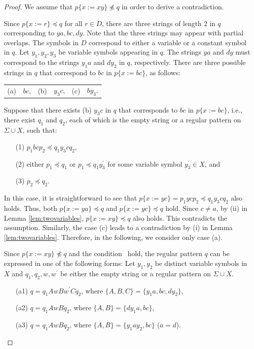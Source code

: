   \begin{proof}
  We assume that $p \{ x := xy \} \not \preceq q$ in order to derive a contradiction.

  Since $p \{ x := r \} \preceq q$ for all $r \in D$, there are three strings of length $2$ in $q$ corresponding to $ya, bc, dy$.
  Note that the three strings may appear with partial overlaps.
  The symbols in $D$ correspond to either a variable or a constant symbol in $q$.
  Let $y_{1}, y_{2}, y_{3}$ be variable symbols appearing in $q$.
  The strings $ya$ and $dy$ must correspond to the strings $y_{1}a$ and $dy_{2}$ in $q$, respectively.
  There are three possible strings in $q$ that correspond to $bc$ in $p\{x:=bc\}$, as follows:
  \begin{center}
    \begin{tabular}{cccccc}
      \textrm{(a)} & $bc$, & \textrm{(b)} & $y_{3}c$, & \textrm{(c)} & $by_{3}$.
    \end{tabular}
  \end{center}

  Suppose that there exists (b) $y_{3}c$ in $q$ that corresponds to $bc$ in $p\{x:=bc\}$, i.e., there exist $q_{1}$ and $q_{2}$, each of which is the empty string or a regular pattern on $\Sigma\cup X$, such that:
  \begin{enumerate}
  \item[(1)] $p_{1}bcp_{2} \preceq q_{1}y_{3}cq_{2}$, 
  \item[(2)] either $p_{1} \preceq q_{1}$ or $p_{1} \preceq q_{1}y_{3}^{\prime}$ for some variable symbol $y_{3}^{\prime}\in X$, and
  \item[(3)] $p_{2} \preceq q_{2}$.
  \end{enumerate}
  In this case, it is straightforward to see that $p\{x:=yc\} = p_{1}ycp_{2} \preceq q_{1}y_{3}cq_{2}$ also holds.
  Thus, both $p\{x:=ya\}\preceq q$ and $p\{x:=yc\}\preceq q$ hold. Since $c\not= a$, by (ii) in Lemma \ref{lem:twovariables}, $p\{x:=xy\}\preceq q$ also holds. This contradicts the assumption.
  Similarly, the case (c) leads to a contradiction by (i) in Lemma \ref{lem:twovariables}.
  Therefore, in the following, we consider only case (a).

  Since $p \{ x := xy \} \not \preceq q$ and the condition \TheConditionA\ hold, the regular pattern $q$ can be expressed in one of the following forms: Let $y_{1}, y_{2}$ be distinct variable symbols in $X$ and $q_{1}, q_{2}, w, w^{\prime}$ be either the empty string or a regular pattern on $\Sigma\cup X$.
  \begin{enumerate}
  \item[(a1)] $q=q_{1}AwBw^{\prime}Cq_{2}$, where $\{ A,B,C \} = \{ y_{1}a,bc,dy_{2} \}$,
  \item[(a2)] $q=q_{1}AwBq_{2}$, where $\{ A,B \} = \{ dy_{1}a,bc \}$,
  \item[(a3)] $q=q_{1}AwBq_{2}$, where $\{ A,B \} = \{ y_{1}ay_{2},bc \}$ ($a = d$).
  \end{enumerate}
  

\end{proof}
